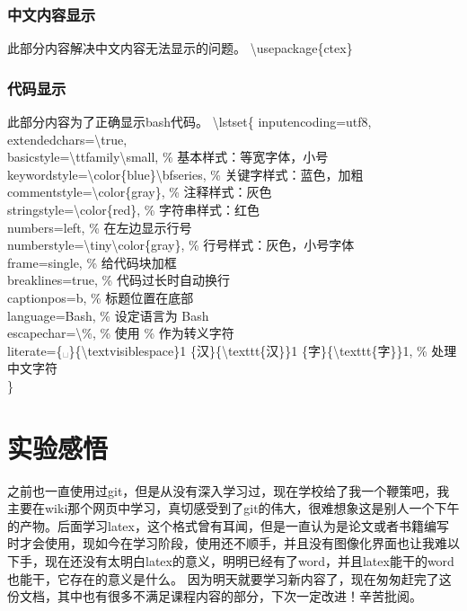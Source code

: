 \documentclass{article}
\begin{document}
		
	\subsubsection{中文内容显示}
	此部分内容解决中文内容无法显示的问题。
		\textbackslash usepackage\{ctex\}\\
		
	\subsubsection{代码显示}
	此部分内容为了正确显示bash代码。
		\textbackslash lstset\{
		inputencoding=utf8,\\
		extendedchars=\textbackslash true,\\
		basicstyle=\textbackslash ttfamily\textbackslash small, \% 基本样式：等宽字体，小号\\
		keywordstyle=\textbackslash color\{blue\}\textbackslash bfseries, \% 关键字样式：蓝色，加粗\\
		commentstyle=\textbackslash color\{gray\}, \% 注释样式：灰色\\
		stringstyle=\textbackslash color\{red\}, \% 字符串样式：红色\\
		numbers=left, \% 在左边显示行号\\
		numberstyle=\textbackslash tiny\textbackslash color\{gray\}, \% 行号样式：灰色，小号字体\\
		frame=single, \% 给代码块加框\\
		breaklines=true, \% 代码过长时自动换行\\
		captionpos=b, \% 标题位置在底部\\
		language=Bash, \% 设定语言为 Bash\\
		escapechar=\textbackslash\%, \% 使用 \% 作为转义字符\\
		literate=\{␣\}\{\textbackslash textvisiblespace\}1 \{汉\}\{\textbackslash texttt\{汉\}\}1 \{字\}\{\textbackslash texttt\{字\}\}1, \% 处理中文字符\\
		\}\\
		
		
		
	\section{实验感悟}
	之前也一直使用过git，但是从没有深入学习过，现在学校给了我一个鞭策吧，我主要在wiki那个网页中学习，真切感受到了git的伟大，很难想象这是别人一个下午的产物。后面学习latex，这个格式曾有耳闻，但是一直认为是论文或者书籍编写时才会使用，现如今在学习阶段，使用还不顺手，并且没有图像化界面也让我难以下手，现在还没有太明白latex的意义，明明已经有了word，并且latex能干的word也能干，它存在的意义是什么。
	因为明天就要学习新内容了，现在匆匆赶完了这份文档，其中也有很多不满足课程内容的部分，下次一定改进！辛苦批阅。
\end{document}
